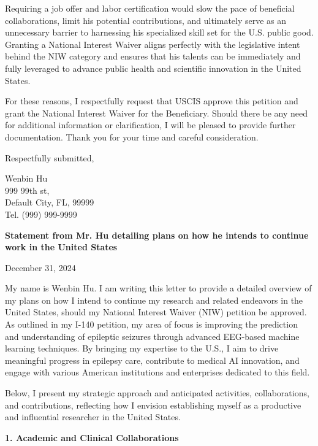 \documentclass{article}
\begin{document}
Requiring a job offer and labor certification would slow the pace of beneficial collaborations, limit his potential contributions, and ultimately serve as an unnecessary barrier to harnessing his specialized skill set for the U.S. public good. Granting a National Interest Waiver aligns perfectly with the legislative intent behind the NIW category and ensures that his talents can be immediately and fully leveraged to advance public health and scientific innovation in the United States.

For these reasons, I respectfully request that USCIS approve this petition and grant the National Interest Waiver for the Beneficiary. Should there be any need for additional information or clarification, I will be pleased to provide further documentation.
Thank you for your time and careful consideration.

Respectfully submitted,

\vspace{5\baselineskip}

Wenbin Hu\\
999 99th st,\\
Default City, FL, 99999\\
Tel. (999) 999-9999




\clearpage

{\bf Statement from Mr. Hu detailing plans on how he intends to continue work in the United States}

\label{plans}
December 31, 2024

My name is Wenbin Hu. I am writing this letter to provide a detailed overview of my plans on how I intend to continue my research and related endeavors in the United States, should my National Interest Waiver (NIW) petition be approved. As outlined in my I-140 petition, my area of focus is improving the prediction and understanding of epileptic seizures through advanced EEG-based machine learning techniques. By bringing my expertise to the U.S., I aim to drive meaningful progress in epilepsy care, contribute to medical AI innovation, and engage with various American institutions and enterprises dedicated to this field.

Below, I present my strategic approach and anticipated activities, collaborations, and contributions, reflecting how I envision establishing myself as a productive and influential researcher in the United States.


{\bf 1. Academic and Clinical Collaborations }
\end{document}
